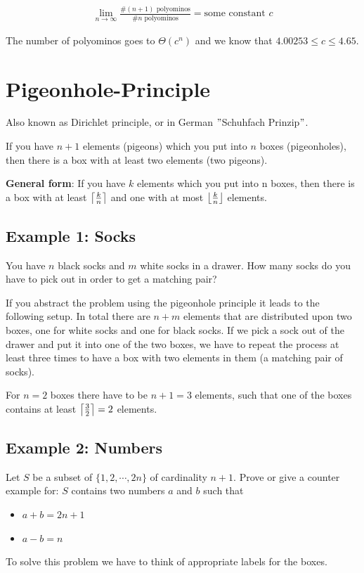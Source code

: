 \documentclass[12pt,onecolumn%
]{scrartcl}
\DeclarePairedDelimiter\ceil{\lceil}{\rceil}
\DeclarePairedDelimiter\floor{\lfloor}{\rfloor}
\newcommand{\eq}[1]{
\begin{equation*}
\begin{aligned}
#1
\end{aligned}
\end{equation*}
}
\newcommand{\newsection}[1]{
\cleardoublepage
\section{#1}
}
\begin{document}
\eq{\lim\limits_{n \rightarrow \infty}\frac{\# (n+1) \text{ polyominos}}{\# n \text{ polyominos}} = \text{some constant } c}

The number of polyominos goes to $\Theta(c^n)$ and we know that $4.00253 \le c \le 4.65$.

\newsection{Pigeonhole-Principle}

Also known as Dirichlet principle, or in German $"$Schuhfach Prinzip$"$.

If you have $n+1$ elements (pigeons) which you put into $n$ boxes (pigeonholes), then there is a box with at least two elements (two pigeons).

{\bf General form}: If you have $k$ elements which you put into n boxes, then there is a box with at least $\ceil*{\frac{k}{n}}$ and one with at most $\floor*{\frac{k}{n}}$ elements.

\subsection{Example 1: Socks}

You have $n$ black socks and $m$ white socks in a drawer. How many socks do you have to pick out in order to get a matching pair?

If you abstract the problem using the pigeonhole principle it leads to the following setup. In total there are $n+m$ elements that are distributed upon two boxes, one for white socks and one for black socks. If we pick a sock out of the drawer and put it into one of the two boxes, we have to repeat the process at least three times to have a box with two elements in them (a matching pair of socks).

For $n=2$ boxes there have to be $n+1=3$ elements, such that one of the boxes contains at least $\ceil*{\frac{3}{2}} = 2$ elements.

\subsection{Example 2: Numbers}

Let $S$ be a subset of $\{1,2,\cdots, 2n\}$ of cardinality $n+1$. Prove or give a counter example for: $S$ contains two numbers $a$ and $b$ such that
\begin{itemize}
\item $a+b = 2n + 1$
\item $a-b = n$
\end{itemize}

To solve this problem we have to think of appropriate labels for the boxes.
\end{document}
